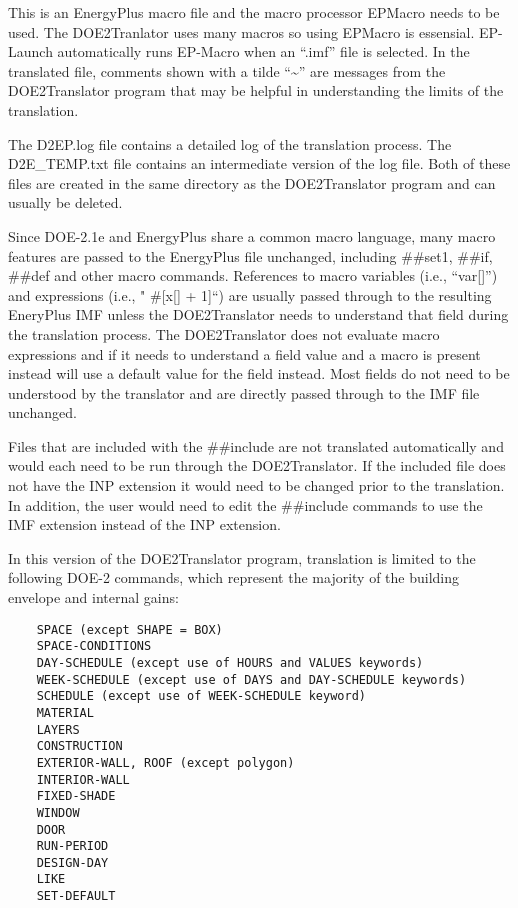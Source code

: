 This is an EnergyPlus macro file and the macro processor EPMacro needs to be used. The DOE2Tranlator uses many macros so using EPMacro is essensial. EP-Launch automatically runs EP-Macro when an ``.imf'' file is selected. In the translated file, comments shown with a tilde ``\textasciitilde{}'' are messages from the DOE2Translator program that may be helpful in understanding the limits of the translation.

The D2EP.log file contains a detailed log of the translation process. The D2E\_TEMP.txt file contains an intermediate version of the log file. Both of these files are created in the same directory as the DOE2Translator program and can usually be deleted.

Since DOE-2.1e and EnergyPlus share a common macro language, many macro features are passed to the EnergyPlus file unchanged, including \#\#set1, \#\#if, \#\#def and other macro commands. References to macro variables (i.e., ``var{[}{]}'') and expressions (i.e., " \#{[}x{[}{]} + 1{]}``) are usually passed through to the resulting EneryPlus IMF unless the DOE2Translator needs to understand that field during the translation process. The DOE2Translator does not evaluate macro expressions and if it needs to understand a field value and a macro is present instead will use a default value for the field instead. Most fields do not need to be understood by the translator and are directly passed through to the IMF file unchanged.

Files that are included with the \#\#include are not translated automatically and would each need to be run through the DOE2Translator. If the included file does not have the INP extension it would need to be changed prior to the translation. In addition, the user would need to edit the \#\#include commands to use the IMF extension instead of the INP extension.

In this version of the DOE2Translator program, translation is limited to the following DOE-2 commands, which represent the majority of the building envelope and internal gains:

\begin{lstlisting}
    SPACE (except SHAPE = BOX)
    SPACE-CONDITIONS
    DAY-SCHEDULE (except use of HOURS and VALUES keywords)
    WEEK-SCHEDULE (except use of DAYS and DAY-SCHEDULE keywords)
    SCHEDULE (except use of WEEK-SCHEDULE keyword)
    MATERIAL
    LAYERS
    CONSTRUCTION
    EXTERIOR-WALL, ROOF (except polygon)
    INTERIOR-WALL
    FIXED-SHADE
    WINDOW
    DOOR
    RUN-PERIOD
    DESIGN-DAY
    LIKE
    SET-DEFAULT
\end{lstlisting}
